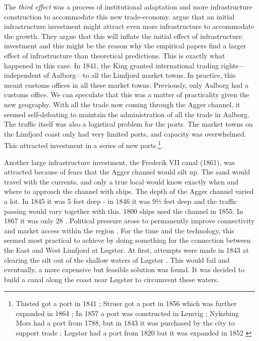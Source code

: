 \documentclass[11pt]{article}
\begin{document}
The \textit{third effect} was a process of institutional adaptation and more infrastructure construction to accommodate this new trade-economy. \cite{Redding2015} argue that an initial infrastructure investment might attract even more infrastructure to accommodate the growth. They argue that this will inflate the initial effect of infrastructure investment and this might be the reason why the empirical papers find a larger effect of infrastructure than theoretical predictions. This is exactly what happened in this case. In 1841, the King granted international trading rights— independent of Aalborg—to all the Limfjord market towns. In practice, this meant customs offices in all these market towns. Previously, only Aalborg had a customs office. We can speculate that this was a matter of practicality given the new geography. With all the trade now coming through the Agger channel, it seemed self-defeating to maintain the administration of all the trade in Aalborg. The traffic itself was also a logistical problem for the ports. The market towns on the Limfjord coast only had very limited ports, and capacity was overwhelmed. This attracted investment in a series of new ports.\footnote{Thisted got a port in 1841 \citep[p. 384-386]{Dioerup1842Thisted}; Struer got a port in 1856 which was further expanded in 1864 \citep[vol V, p. 467]{Trap3}; In 1857 a port was constructed in Lemvig \citep[vol V, p. 474]{Trap3}; Nykøbing Mors had a port from 1788, but in 1843 it was purchased by the city to support trade \citep[vol IV, p. 214]{Trap3}; Løgstør had a port from 1820 but it was expanded in 1852 \citep[vol IV, pp. 399-400]{Trap3}}.

Another large infrastructure investment, the Frederik VII canal (1861), was attracted because of fears that the Agger channel would silt up. The sand would travel with the currents, and only a true local would know exactly when and where to approach the channel with ships. The depth of the Agger channel varied a lot. In 1845 it was 5 feet deep - in 1846 it was 9½ feet deep \citep{Petersen1877} and the traffic passing would vary together with this. 1800 ships used the channel in 1855. In 1867 it was only 28 \citep{Ravn1993}. Political pressure arose to permanently improve connectivity and market access within the region \citep{petersen1853oplysende}. For the time and the technology, this seemed most practical to achieve by doing something for the connection between the East and West Limfjord at Løgstør. At first, attempts were made in 1843 at clearing the silt out of the shallow waters of Løgstør \citep{Bergsoee1844, p. 311; petersen1853oplysende, p. 4}. This would fail and eventually, a more expensive but feasible solution was found. It was decided to build a canal along the coast near Løgstør to circumvent these waters.
\end{document}
